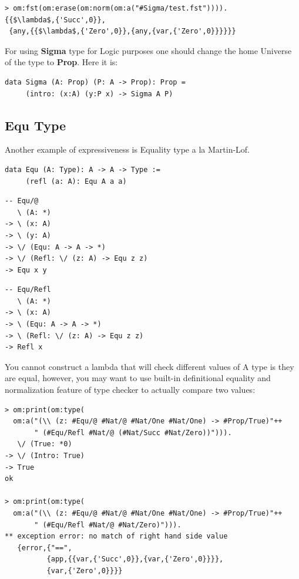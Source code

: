 \documentclass{aip-cp}
\begin{document}
\begin{lstlisting}[mathescape=true]
> om:fst(om:erase(om:norm(om:a("#Sigma/test.fst")))).
{{$\lambda$,{'Succ',0}},
 {any,{{$\lambda$,{'Zero',0}},{any,{var,{'Zero',0}}}}}}
\end{lstlisting}

For using {\bf Sigma} type for Logic purposes one should change the home Universe of the type to {\bf Prop}.
Here it is:

\begin{lstlisting}[mathescape=true]
data Sigma (A: Prop) (P: A -> Prop): Prop =
     (intro: (x:A) (y:P x) -> Sigma A P)
\end{lstlisting}

\subsection{Equ Type}
Another example of expressiveness is Equality type a la Martin-Lof.

\begin{lstlisting}
data Equ (A: Type): A -> A -> Type :=
     (refl (a: A): Equ A a a)
\end{lstlisting}

\begin{lstlisting}
-- Equ/@
   \ (A: *)
-> \ (x: A)
-> \ (y: A)
-> \/ (Equ: A -> A -> *)
-> \/ (Refl: \/ (z: A) -> Equ z z)
-> Equ x y
\end{lstlisting}

\begin{lstlisting}
-- Equ/Refl
   \ (A: *)
-> \ (x: A)
-> \ (Equ: A -> A -> *)
-> \ (Refl: \/ (z: A) -> Equ z z)
-> Refl x
\end{lstlisting}

You cannot construct a lambda that will check different values of A type is they are equal,
however, you may want to use built-in definitional equality and
normalization feature of type checker to actually compare two values:

\begin{lstlisting}[mathescape=true]
> om:print(om:type(
  om:a("(\\ (z: #Equ/@ #Nat/@ #Nat/One #Nat/One) -> #Prop/True)"++
       " (#Equ/Refl #Nat/@ (#Nat/Succ #Nat/Zero))"))).
   \/ (True: *0)
-> \/ (Intro: True)
-> True
ok

> om:print(om:type(
  om:a("(\\ (z: #Equ/@ #Nat/@ #Nat/One #Nat/One) -> #Prop/True)"++
       " (#Equ/Refl #Nat/@ #Nat/Zero)"))).
** exception error: no match of right hand side value
   {error,{"==",
          {app,{{var,{'Succ',0}},{var,{'Zero',0}}}},
          {var,{'Zero',0}}}}
\end{lstlisting}
\end{document}
